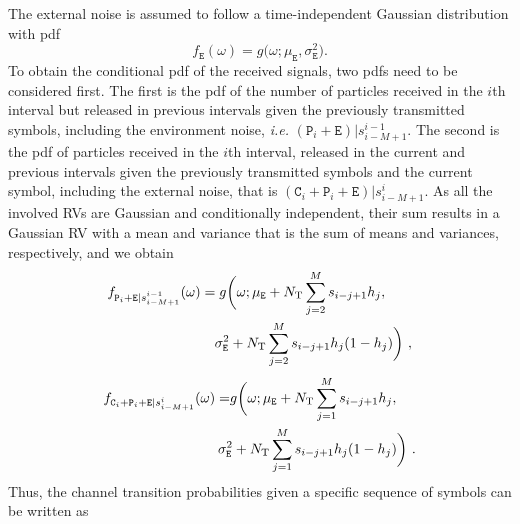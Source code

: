 \documentclass[journal]{IEEEtranTCOM}
\begin{document}
The external noise is assumed to follow a time-independent Gaussian distribution with pdf
\begin{equation}
    f_{ \mathtt{E}}(\omega) = g\Big(\omega;\mu_{ \mathtt{E}},\sigma_{ \mathtt{E}}^{2}\Big).
\end{equation}
To obtain the conditional pdf of the received signals, two pdfs need to be considered first. The first is the pdf of the number of particles received in the $i$th interval but released in previous intervals given the previously transmitted symbols, including the environment noise, \textit{i.e.} $ (\mathtt{P}_{i}+ \mathtt{E})|s_{i-M+1}^{i-1}$. The second is the pdf of particles received in the $i$th interval, released in the current and previous intervals given the previously transmitted symbols and the current symbol, including the external noise, that is $ (\mathtt{C}_{i}+ \mathtt{P}_{i}+ \mathtt{E})|s_{i-M+1}^{i}$. As all the involved RVs are Gaussian and conditionally independent, their sum results in a Gaussian RV with a mean and variance that is the sum of means and variances, respectively, and we obtain
\begin{align}
    \begin{split}
    &f_{ \mathtt{P}_{i}+ \mathtt{E}|s_{i-M+1}^{i-1}}(\omega) =  g\bigg(\omega;\mu_{\mathtt{E}}+N_{\mathrm{T}}\sum_{j=2}^{M}s_{i-j+1}h_{j},\\& \hspace{2.7cm}\sigma_{\mathtt{E}}^{2}+N_{\mathrm{T}}\sum^{M}_{j=2}s_{i-j+1}h_{j}(1-h_{j})\bigg)~,
    \end{split}
\end{align}
\begin{align}
    \begin{split}
    f_{\mathtt{C}_{i}+ \mathtt{P}_{i}+\mathtt{E}|s_{i-M+1}^{i}}(\omega) = & g\bigg(\omega;\mu_{\mathtt{E}}+N_{\mathrm{T}}\sum^{M}_{j=1}s_{i-j+1}h_{j},\\& \hspace{-0.3cm}\sigma_{\mathtt{E}}^{2}+N_{\mathrm{T}} 
    \sum^{M}_{j=1}s_{i-j+1}h_{j}(1-h_{j})\bigg)~.
    \end{split}
\end{align}
Thus, the channel transition probabilities given a specific sequence of symbols can be written as
\end{document}
